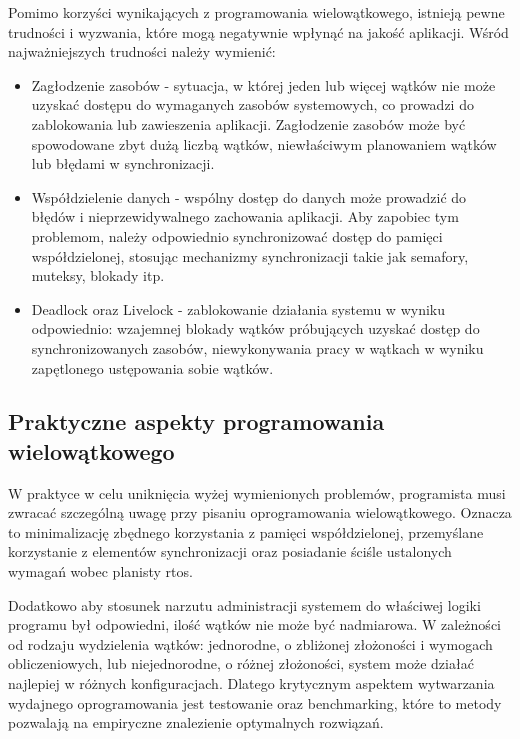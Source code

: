 Pomimo korzyści wynikających z programowania wielowątkowego, istnieją pewne trudności i wyzwania,
które mogą negatywnie wpłynąć na jakość aplikacji. Wśród najważniejszych trudności należy wymienić:
\begin{itemize}
      \item Zagłodzenie zasobów - sytuacja, w której jeden lub więcej wątków nie może uzyskać dostępu do wymaganych zasobów systemowych,
            co prowadzi do zablokowania lub zawieszenia aplikacji. Zagłodzenie zasobów może być spowodowane zbyt dużą liczbą wątków,
            niewłaściwym planowaniem wątków lub błędami w synchronizacji.
      \item Współdzielenie danych - wspólny dostęp do danych może prowadzić do błędów i nieprzewidywalnego zachowania aplikacji.
            Aby zapobiec tym problemom, należy odpowiednio synchronizować dostęp do pamięci współdzielonej, stosując mechanizmy synchronizacji
            takie jak semafory, muteksy, blokady itp.
      \item Deadlock oraz Livelock - zablokowanie działania systemu w wyniku odpowiednio:
            wzajemnej blokady wątków próbujących uzyskać dostęp do synchronizowanych zasobów,
            niewykonywania pracy w wątkach w wyniku zapętlonego ustępowania sobie wątków.
\end{itemize}

\subsection{Praktyczne aspekty programowania wielowątkowego}
W praktyce w celu uniknięcia wyżej wymienionych problemów, programista musi zwracać szczególną uwagę przy pisaniu
oprogramowania wielowątkowego. Oznacza to minimalizację zbędnego korzystania z pamięci współdzielonej, przemyślane korzystanie
z elementów synchronizacji oraz posiadanie ściśle ustalonych wymagań wobec planisty \gls{rtos}.

Dodatkowo aby stosunek narzutu administracji systemem do właściwej logiki programu był odpowiedni, ilość wątków nie może być nadmiarowa.
W zależności od rodzaju wydzielenia wątków: jednorodne, o zbliżonej złożoności i wymogach obliczeniowych, lub niejednorodne, o różnej złożoności,
system może działać najlepiej w różnych konfiguracjach. Dlatego krytycznym aspektem wytwarzania wydajnego oprogramowania jest testowanie oraz
\gls{benchmarking}, które to metody pozwalają na empiryczne znalezienie optymalnych rozwiązań.

